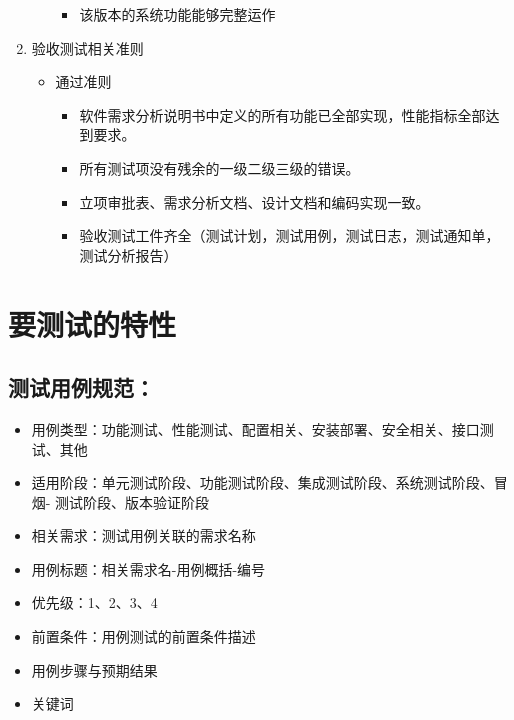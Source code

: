\documentclass[hyperref, a4paper]{ctexart}
\providecommand{\tightlist}{%
  \setlength{\itemsep}{0pt}\setlength{\parskip}{0pt}}
\begin{document}
\begin{enumerate}
\begin{itemize}
    \begin{itemize}
    \tightlist
    \item
      该版本的系统功能能够完整运作
    \end{itemize}
  \end{itemize}
\item
  验收测试相关准则

  \begin{itemize}
  \tightlist
  \item
    通过准则

    \begin{itemize}
    \tightlist
    \item
      软件需求分析说明书中定义的所有功能已全部实现，性能指标全部达到要求。
    \item
      所有测试项没有残余的一级二级三级的错误。
    \item
      立项审批表、需求分析文档、设计文档和编码实现一致。
    \item
      验收测试工件齐全（测试计划，测试用例，测试日志，测试通知单，测试分析报告）
    \end{itemize}
  \end{itemize}
\end{enumerate}

\hypertarget{ux8981ux6d4bux8bd5ux7684ux7279ux6027}{%
\section{要测试的特性}\label{ux8981ux6d4bux8bd5ux7684ux7279ux6027}}

\hypertarget{ux6d4bux8bd5ux7528ux4f8bux89c4ux8303}{%
\subsection{测试用例规范：}\label{ux6d4bux8bd5ux7528ux4f8bux89c4ux8303}}

\begin{itemize}
\tightlist
\item
  用例类型：功能测试、性能测试、配置相关、安装部署、安全相关、接口测试、其他
\item
  适用阶段：单元测试阶段、功能测试阶段、集成测试阶段、系统测试阶段、冒烟-
  测试阶段、版本验证阶段
\item
  相关需求：测试用例关联的需求名称
\item
  用例标题：相关需求名-用例概括-编号
\item
  优先级：1、2、3、4
\item
  前置条件：用例测试的前置条件描述
\item
  用例步骤与预期结果
\item
  关键词
\end{itemize}
\end{document}
